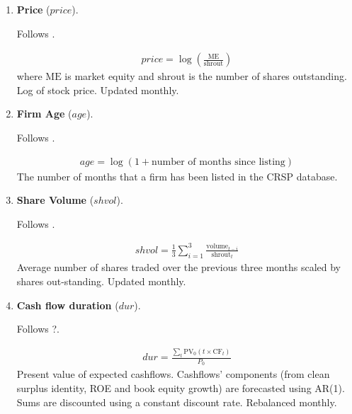 \begin{enumerate}
	
	
	\item \textbf{Price} ($price$). 
	
	Follows . 
	
	\begin{align*}
		price = \log\left( \frac{ \mathrm{ME} }{ \mathrm{shrout} } \right)
	\end{align*}
	where $\mathrm{ME}$ is market equity and $\mathrm{shrout}$ is the number of shares outstanding. Log of stock price. Updated monthly.
	
	
	
	\item \textbf{Firm Age} ($age$). 
	
	Follows . 
	
	\begin{align*}
		age = \log(1 + \text{number of months since listing})
	\end{align*}
	The number of months that a firm has been listed in the CRSP database.
	
	
	
	\item \textbf{Share Volume} ($shvol$). 
	
	Follows . 
	
	\begin{align*}
		shvol = \frac{1}{3} \sum^3_{i=1} \frac{ \mathrm{volume}_{t-i} }{ \mathrm{shrout}_t }
	\end{align*}
	Average number of shares traded over the previous three months scaled by shares out-standing. Updated monthly.
	
	
	
	\item \textbf{Cash flow duration} ($dur$). 
	
	Follows ?. 
	
	\begin{align*}
		dur = \frac{ \sum_t \mathrm{PV}_0 \left( t \times \mathrm{CF}_t \right) }{ P_0 }
	\end{align*}
	Present value of expected cashflows. Cashflows' components (from clean surplus identity, ROE and book equity growth) are forecasted using AR(1). Sums are discounted using a constant discount rate. Rebalanced monthly.
		
\end{enumerate}




